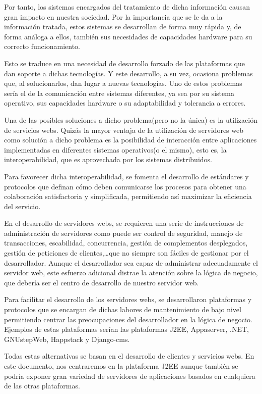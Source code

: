 \documentclass[a4paper, 10pt]{article}
\begin{document}
	Por tanto, los sistemas encargados del tratamiento de dicha información causan
	gran impacto en nuestra sociedad. Por la importancia que se le da a la información
	tratada, estos sistemas se desarrollan de forma muy rápida y, de forma análoga a
	ellos, también sus necesidades de capacidades hardware para su correcto funcionamiento.
	
	Esto se traduce en una necesidad de desarrollo forzado de las plataformas que dan
	soporte a dichas tecnologías. Y este desarrollo, a su vez, ocasiona problemas que,
	al solucionarlos, dan lugar a nuevas tecnologías. Uno de estos problemas sería el de
	la comunicación entre sistemas diferentes, ya sea por su sistema operativo, sus
	capacidades hardware o su adaptabilidad y tolerancia a errores.
	
	Una de las posibles soluciones a dicho problema(pero no la única) es la utilización
	de servicios webs. Quizás la mayor ventaja de la utilización de servidores web como
	solución a dicho problema es la posibilidad de interacción entre aplicaciones
	implementadas en diferentes sistemas operativos(o el mismo), esto es, la
	interoperabilidad, que es aprovechada por los sistemas distribuidos.
	
	Para favorecer dicha interoperabilidad, se fomenta el desarrollo de estándares y
	protocolos que definan cómo deben comunicarse los procesos para obtener una
	colaboración satisfactoria y simplificada, permitiendo así maximizar la eficiencia
	del servicio.
	
	En el desarrollo de servidores webs, se requieren una serie de instrucciones de
	administración de servidores como puede ser control de seguridad, manejo de
	transacciones, escabilidad, concurrencia, gestión de complementos desplegados,
	gestión de peticiones de clientes,\dots que no siempre son fáciles de gestionar por
	el desarrollador. Aunque el desarrollador sea capaz de administrar adecuadamente el
	servidor web, este esfuerzo adicional distrae la atención sobre la lógica de negocio,
	que debería ser el centro de desarrollo de nuestro servidor web.
	
	Para facilitar el desarrollo de los servidores webs, se desarrollaron plataformas y
	protocolos que se encargan de dichas labores de mantenimiento de bajo nivel permitiendo
	centrar las preocupaciones del desarrollador en la lógica de negocio. Ejemplos de estas
	plataformas serían las plataformas J2EE, Appaserver, .NET, GNUstepWeb, Happstack y
	Django-cms.
	
	Todas estas alternativas se basan en el desarrollo de clientes y servicios webs. En
	este documento, nos centraremos en la plataforma J2EE aunque también se podría exponer
	gran variedad de servidores de aplicaciones basados en cualquiera de las otras plataformas.
	
\end{document}
